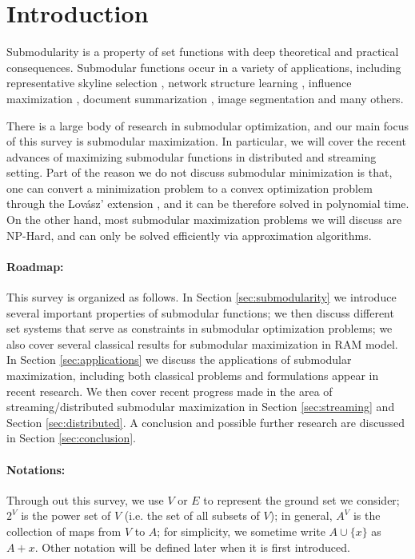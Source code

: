 \section{Introduction}
Submodularity is a property of set functions with deep theoretical and practical consequences. Submodular functions occur in a variety of applications, including representative skyline selection \cite{SLN+11}, network structure learning \cite{GLK10}, influence maximization \cite{KKT03}, document summarization \cite{LB11}, image segmentation \cite{BJM01,KKT09} and many others.


There is a large body of research in submodular optimization, and our main focus of this survey is submodular maximization. In particular, we will cover the recent advances of maximizing submodular functions in distributed and streaming setting. Part of the reason we do not discuss submodular minimization is that, one can convert a minimization problem to a convex optimization problem through the Lov{\'a}sz' extension \cite{L83}, and it can be therefore solved in polynomial time. On the other hand, most submodular maximization problems we will discuss are NP-Hard, and can only be solved efficiently via approximation algorithms.


\paragraph{Roadmap:}
This survey is organized as follows. In Section \ref{sec:submodularity} we introduce several important properties of submodular functions; we then discuss different set systems that serve as constraints in submodular optimization problems; we also cover several classical results for submodular maximization in RAM model. In Section \ref{sec:applications} we discuss the applications of submodular maximization, including both classical problems and formulations appear in recent research. We then cover recent progress made in the area of streaming/distributed submodular maximization in Section \ref{sec:streaming} and Section \ref{sec:distributed}.  A conclusion and possible further research are discussed in Section \ref{sec:conclusion}.






\paragraph{Notations:}
Through out this survey, we use $V$ or $E$ to represent the ground set we consider; $2^V$ is the power set of $V$ (i.e. the set of all subsets of $V$); in general, $A^V$ is the collection of maps from $V$ to $A$; for simplicity, we sometime write $A \cup \{x\}$ as $A + x$. Other notation will be defined later when it is first introduced.

